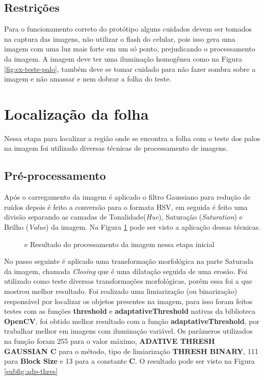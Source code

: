 \subsection{Restrições}
\label{subsec:restricoes}
Para o funcionamento correto do protótipo alguns cuidados devem ser tomados na captura das imagens, não utilizar o flash do celular, pois isso gera uma imagem com uma luz mais forte em um só ponto, prejudicando o processamento da imagem. A imagem deve ter uma iluminação homogênea como na Figura \ref{fig:ex-teste-palo}, também deve se tomar cuidado para não fazer sombra sobre a imagem e não amassar e nem dobrar a folha do teste.

\section{Localização da folha}
\label{sec:loc-folha}

Nessa etapa para localizar a região onde se encontra a folha com o teste dos palos na imagem foi utilizado diversas técnicas de processamento de imagens. 

\subsection{Pré-processamento}
\label{sec:pre-proce}

Após o carregamento da imagem é aplicado o filtro Gaussiano para redução de ruídos depois é  feito a conversão para o formata HSV, em seguida é feito uma divisão separando as camadas de Tonalidade(\textit{Hue}), Saturação (\textit{Saturation}) e  Brilho (\textit{Value}) da imagem. Na Figura  \ref{fig:subfiguras} pode ser visto a aplicação dessas técnicas.
\begin{figure}[h]
 \centering
   \qquad
   \caption{{} e {} Resultado do processamento da imagem nessa etapa inicial }
  \label{fig:subfiguras}
\end{figure}
No passo seguinte é aplicado uma transformação morfológica na parte Saturada da imagem,  chamada \textit{Closing} que é uma dilatação seguida de uma erosão. Foi utilizado como teste diversas transformações morfológicas, porém essa foi a que mostrou melhor resultado. Foi realizado uma limiarização (ou binarização) responsável por localizar os objetos presentes na imagem, para isso foram feitos testes com as funções \textbf{threshold} e \textbf{adaptativeThreshold} nativas da biblioteca \textbf{OpenCV}, foi obtido  melhor resultado com a função \textbf{adaptativeThreshold}, por trabalhar melhor em imagens com iluminação variável. Os parâmeros utilizados na função foram 255 para o valor máximo, \textbf{ADATIVE THRESH GAUSSIAN C}  para o método, tipo de limiarização \textbf{THRESH BINARY}, 111 para \textbf{Block Size } e 13 para a constante \textbf{C}.
O resultado pode ser visto na Figura  \ref{subfig:adp-thres} 

